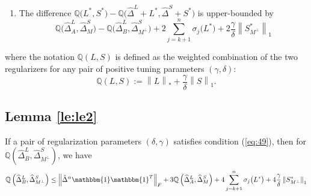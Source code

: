 \documentclass[AMS,STIX1COL]{WileyNJD-v2}
\begin{document}
{\begin{lemma}
\begin{enumerate}
\begin{equation}
    \end{equation}
 \item The difference $\mathbb{Q}\big(L^{*},S^{*}\big) -  \mathbb{Q}\big(\widehat{\Delta}^L + L^{*},\widehat{\Delta}^S + S^{*}\big)$ is upper-bounded by
    \begin{equation} \label{eq:28}
        \mathbb{Q}\big(\widehat{\Delta}^L_{A},\widehat{\Delta}^S_{M}\big) - \mathbb{Q}\big(\widehat{\Delta}^L_{B},\widehat{\Delta}^S_{M^\perp}\big)
        +2 \sum_{j=k+1}^{n} \sigma_{j}\big(L^*\big) + 2\frac{\gamma}{\delta}\left\|S^*_{M^\perp}\right\|_{1}
    \end{equation}
\end{enumerate}
\end{lemma}
where the notation $\mathbb{Q}(L,S)$ is defined as the weighted combination of the two regularizers for any pair of positive tuning parameters $(\gamma,\delta)$:
\[
\mathbb{Q}\left(L,S\right)   := \left\|L\right\|_{*} + \frac{\gamma}{\delta}\left\|S\right\|_1.
\]

\subsection{Lemma \ref{le:le2}}
\begin{lemma} \label{le:le2}
If a pair of regularization parameters $(\delta,\gamma)$ satisfies condition (\ref{eq:49}), then for $\mathbb{Q}\left(\widehat{\Delta}^L_{B},\widehat{\Delta}^S_{M^\perp}\right)$, we have
\[
    \mathbb{Q}\left(\widehat{\Delta}^L_{B},\widehat{\Delta}^S_{M^\perp}\right) \leq
    \left\|\hat{\Delta}^{\alpha}\mathbbm{1}\mathbbm{1}^T\right\|_{F} +
    3\mathbb{Q}\left(\widehat{\Delta}^{L}_{A},\widehat{\Delta}^{S}_{M}\right)+4 \sum_{j=k+1}^{n} \sigma_{j}\big(L^{*}\big) + 4\frac{\gamma}{\delta}
    \left\|S^{*}_{M^\perp}\right\|_{1}
\]
\end{lemma}

}
\end{document}
